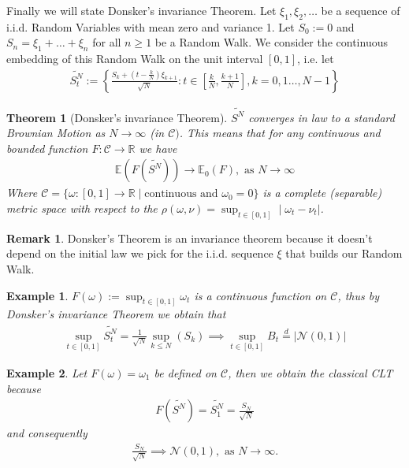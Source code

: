 \documentclass[11pt,a4paper, final]{article}
\newtheorem{thm}{Theorem}[section]
\newtheorem{exmp}{Example}[section]
\theoremstyle{definition}
\newtheorem{rem}{Remark}[section]
\begin{document}
\newpage
\noindent Finally we will state Donsker's invariance Theorem. Let $\xi_1, \xi_2, \dots$ be a sequence of i.i.d. Random Variables with mean zero and variance 1. Let $S_0:=0$ and $S_n = \xi_1 + \dots + \xi_n$ for all $n \geq 1$ be a Random Walk. We consider the continuous embedding of this Random Walk on the unit interval $[0,1]$, i.e. let 
\begin{align*}
\widetilde{S_t^N}:= \left\lbrace \frac{S_k+ \left( t- \frac{k}{N}\right) \xi_{k+1}}{\sqrt{N}} : t \in \left[ \frac{k}{N}, \frac{k+1}{N} \right], k = 0,1 \dots , N-1 \right\rbrace 
\end{align*}
\begin{thm}[Donsker's invariance Theorem] $\widetilde{S^N}$ converges in law to a standard Brownian Motion as $N \to \infty$ (in $\mathcal{C})$. This means that for any continuous and bounded function $F: \mathcal{C} \to \mathbb{R}$ we have 
\begin{align*}
\mathbb{E} \left( F \left( \widetilde{S^N} \right) \right) \to \mathbb{E}_0(F), \text{ as } N \to \infty 
\end{align*}
Where $\mathcal{C}=  \lbrace \omega : [0,1] \to \mathbb{R} \mid \text{continuous and } \omega_0 =0 \rbrace$ is a complete (separable) metric space with respect to the $\rho( \omega, \nu) = \sup_{t \in [0,1]} \mid \omega_t - \nu_t |$. 
\end{thm}
\begin{rem} Donsker's Theorem is an invariance theorem because it doesn't depend on the initial law we pick for the i.i.d. sequence $\xi$ that builds our Random Walk. 
\end{rem}
\begin{exmp} $F( \omega):= \sup_{t \in [0,1]} \omega_t$ is a continuous function on $\mathcal{C}$, thus by Donsker's invariance Theorem we obtain that 
\begin{align*}
 \sup_{t \in [0,1]} \widetilde{S_t^N} = \frac{1}{\sqrt{N}} \sup_{k \leq N} (S_k) \implies  \sup_{t \in [0,1]} B_t \overset{d}= | \mathcal{N}(0,1) | 
\end{align*}
\end{exmp}
\begin{exmp} Let $F( \omega) = \omega_1$ be defined on $\mathcal{C}$, then we obtain the classical CLT because 
\begin{align*}
F(\widetilde{S^N})=\widetilde{S_1^N} = \frac{S_N}{\sqrt{N}} 
\end{align*}
and consequently 
\begin{align*}
\frac{S_N}{\sqrt{N}} \implies \mathcal{N}(0,1), \text{ as } N \to \infty. 
\end{align*}
\end{exmp}
\newpage
\end{document}
